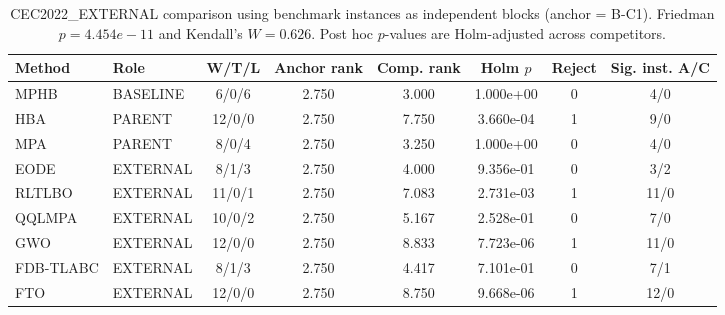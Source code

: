 \begin{table}[!t]
\centering
\footnotesize
\caption{CEC2022\_EXTERNAL comparison using benchmark instances as independent blocks (anchor = B-C1). Friedman $p=4.454e-11$ and Kendall's $W=0.626$. Post hoc $p$-values are Holm-adjusted across competitors.}
\begin{tabular}{llcccccc}
\hline
Method & Role & W/T/L & Anchor rank & Comp. rank & Holm $p$ & Reject & Sig. inst. A/C \\
\hline
MPHB & BASELINE & 6/0/6 & 2.750 & 3.000 & 1.000e+00 & 0 & 4/0 \\
HBA & PARENT & 12/0/0 & 2.750 & 7.750 & 3.660e-04 & 1 & 9/0 \\
MPA & PARENT & 8/0/4 & 2.750 & 3.250 & 1.000e+00 & 0 & 4/0 \\
EODE & EXTERNAL & 8/1/3 & 2.750 & 4.000 & 9.356e-01 & 0 & 3/2 \\
RLTLBO & EXTERNAL & 11/0/1 & 2.750 & 7.083 & 2.731e-03 & 1 & 11/0 \\
QQLMPA & EXTERNAL & 10/0/2 & 2.750 & 5.167 & 2.528e-01 & 0 & 7/0 \\
GWO & EXTERNAL & 12/0/0 & 2.750 & 8.833 & 7.723e-06 & 1 & 11/0 \\
FDB-TLABC & EXTERNAL & 8/1/3 & 2.750 & 4.417 & 7.101e-01 & 0 & 7/1 \\
FTO & EXTERNAL & 12/0/0 & 2.750 & 8.750 & 9.668e-06 & 1 & 12/0 \\
\hline
\end{tabular}
\end{table}
